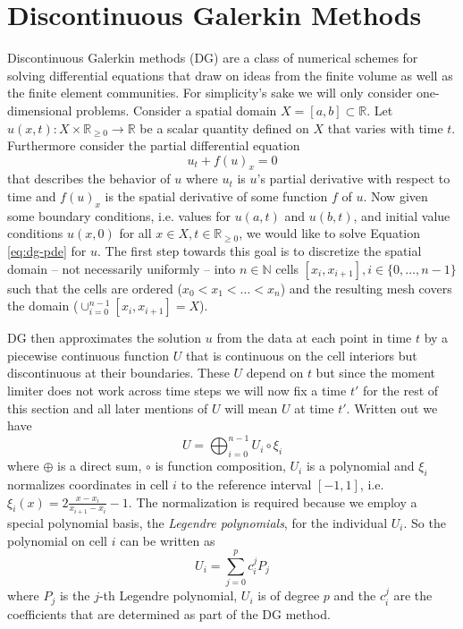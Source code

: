 \section{Discontinuous Galerkin Methods}
\label{sec:dg}

Discontinuous Galerkin methods (DG) are a class of numerical schemes for solving differential equations that draw on ideas from the finite volume as well as the finite element communities.
For simplicity's sake we will only consider one-dimensional problems.
Consider a spatial domain $X = [a, b] \subset \mathbb{R}$.
Let $u(x, t) : X \times \mathbb{R}_{\ge 0} \rightarrow \mathbb{R}$ be a scalar quantity defined on $X$ that varies with time $t$.
Furthermore consider the partial differential equation
\begin{equation}
  \label{eq:dg-pde}
  u_{t} + f(u)_{x} = 0
\end{equation}
that describes the behavior of $u$ where $u_{t}$ is $u$'s partial derivative with respect to time and $f(u)_{x}$ is the spatial derivative of some function $f$ of $u$.
Now given some boundary conditions, i.e. values for $u(a, t)$ and $u(b, t)$, and initial value conditions $u(x, 0)$ for all $x \in X, t \in \mathbb{R}_{\ge 0}$, we would like to solve Equation \eqref{eq:dg-pde} for $u$.
The first step towards this goal is to discretize the spatial domain -- not necessarily uniformly -- into $n \in \mathbb{N}$ cells $[x_{i}, x_{i + 1}], i \in \{ 0, \dots, n - 1 \}$ such that the cells are ordered ($x_{0} < x_{1} < \dots < x_{n}$) and the resulting mesh covers the domain ($\cup_{i = 0}^{n - 1} [x_{i}, x_{i + 1}] = X$).

DG then approximates the solution $u$ from the data at each point in time $t$ by a piecewise continuous function $U$ that is continuous on the cell interiors but discontinuous at their boundaries.
These $U$ depend on $t$ but since the moment limiter does not work across time steps we will now fix a time $t'$ for the rest of this section and all later mentions of $U$ will mean $U$ at time $t'$.
Written out we have
\begin{equation*}
  U = \bigoplus_{i = 0}^{n - 1} U_{i} \circ \xi_{i}
\end{equation*}
where $\oplus$ is a direct sum, $\circ$ is function composition, $U_{i}$ is a polynomial and $\xi_{i}$ normalizes coordinates in cell $i$ to the reference interval $[-1, 1]$, i.e. $\xi_{i}(x) = 2 \frac{x - x_{i}}{x_{i + 1} - x_{i}} - 1$.
The normalization is required because we employ a special polynomial basis, the \emph{Legendre polynomials}, for the individual $U_{i}$.
So the polynomial on cell $i$ can be written as
\begin{equation*}
  U_{i} = \sum_{j = 0}^{p} c_{i}^{j} P_{j}
\end{equation*}
where $P_{j}$ is the $j$-th Legendre polynomial, $U_{i}$ is of degree $p$ and the $c_{i}^{j}$ are the coefficients that are determined as part of the DG method.

